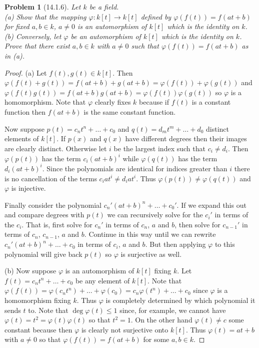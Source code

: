 \documentclass{article}
\newtheorem{problem}{Problem}
\begin{document}
\begin{problem}[14.1.6]
Let $k$ be a field.\\
(a) Show that the mapping $\varphi : k[t] \to k[t]$ defined by $\varphi(f(t)) = f(at + b)$ for fixed $a,b \in k$, $a \neq 0$ is an automorphism of $k[t]$ which is the identity on $k$.\\
(b) Conversely, let $\varphi$ be an automorphism of $k[t]$ which is the identity on $k$. Prove that there exist $a,b \in k$ with $a \neq 0$ such that $\varphi(f(t)) = f(at + b)$ as in (a).
\end{problem}
\begin{proof}
(a) Let $f(t), g(t) \in k[t]$. Then $\varphi(f(t) + g(t)) = f(at+b) + g(at+b) = \varphi(f(t)) + \varphi(g(t))$ and $\varphi(f(t)g(t)) = f(at+b)g(at+b) = \varphi(f(t))\varphi(g(t))$ so $\varphi$ is a homomorphism. Note that $\varphi$ clearly fixes $k$ because if $f(t)$ is a constant function then $f(at+b)$ is the same constant function.

Now suppose $p(t) = c_n t^n + \dots + c_0$ and $q(t) = d_m t^m + \dots + d_0$ distinct elements of $k[t]$. If $p(x)$ and $q(x)$ have different degrees then their images are clearly distinct. Otherwise let $i$ be the largest index such that $c_i \neq d_i$. Then $\varphi(p(t))$ has the term $c_i (at+b)^i$ while $\varphi(q(t))$ has the term $d_i (at + b)^i$. Since the polynomials are identical for indices greater than $i$ there is no cancellation of the terms $c_iat^i \neq d_iat^i$. Thus $\varphi(p(t)) \neq \varphi(q(t))$ and $\varphi$ is injective. 

Finally consider the polynomial $c_n' (at + b)^n + \dots + c_0'$. If we expand this out and compare degrees with $p(t)$ we can recursively solve for the $c_i'$ in terms of the $c_i$. That is, first solve for $c_n'$ in terms of $c_n$, $a$ and $b$, then solve for $c_{n-1}'$ in terms of $c_n$, $c_{n-1}$, $a$ and $b$. Continue in this way until we can rewrite $c_n' (at + b)^n + \dots + c_0$ in terms of $c_i$, $a$ and $b$. But then applying $\varphi$ to this polynomial will give back $p(t)$ so $\varphi$ is surjective as well.

(b) Now suppose $\varphi$ is an automorphism of $k[t]$ fixing $k$. Let $f(t) = c_n t^n + \dots + c_0$ be any element of $k[t]$. Note that $\varphi(f(t)) = \varphi(c_nt^n) + \dots + \varphi(c_0) = c_n \varphi(t^n) + \dots + c_0$ since $\varphi$ is a homomorphism fixing $k$. Thus $\varphi$ is completely determined by which polynomial it sends $t$ to. Note that $\deg \varphi(t) \leq 1$ since, for example, we cannot have $\varphi(t) = t^2 = \varphi(t) \varphi(t)$ so that $t^2 = 1$. On the other hand $\varphi(t) \neq c$ some constant because then $\varphi$ is clearly not surjective onto $k[t]$. Thus $\varphi(t) = at + b$ with $a \neq 0$ so that $\varphi(f(t)) = f(at + b)$ for some $a,b \in k$.
\end{proof}
\end{document}
